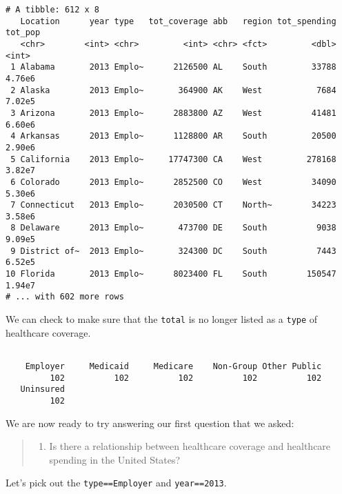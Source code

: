 \documentclass[]{article}
\newenvironment{Shaded}{\begin{snugshade}}{\end{snugshade}}
\newcommand{\KeywordTok}[1]{\textcolor[rgb]{0.13,0.29,0.53}{\textbf{#1}}}
\newcommand{\NormalTok}[1]{#1}
\newcommand{\OperatorTok}[1]{\textcolor[rgb]{0.81,0.36,0.00}{\textbf{#1}}}
\providecommand{\tightlist}{%
  \setlength{\itemsep}{0pt}\setlength{\parskip}{0pt}}
\begin{document}
\begin{verbatim}
# A tibble: 612 x 8
   Location      year type   tot_coverage abb   region tot_spending tot_pop
   <chr>        <int> <chr>         <int> <chr> <fct>         <dbl>   <int>
 1 Alabama       2013 Emplo~      2126500 AL    South         33788  4.76e6
 2 Alaska        2013 Emplo~       364900 AK    West           7684  7.02e5
 3 Arizona       2013 Emplo~      2883800 AZ    West          41481  6.60e6
 4 Arkansas      2013 Emplo~      1128800 AR    South         20500  2.90e6
 5 California    2013 Emplo~     17747300 CA    West         278168  3.82e7
 6 Colorado      2013 Emplo~      2852500 CO    West          34090  5.30e6
 7 Connecticut   2013 Emplo~      2030500 CT    North~        34223  3.58e6
 8 Delaware      2013 Emplo~       473700 DE    South          9038  9.09e5
 9 District of~  2013 Emplo~       324300 DC    South          7443  6.52e5
10 Florida       2013 Emplo~      8023400 FL    South        150547  1.94e7
# ... with 602 more rows
\end{verbatim}

We can check to make sure that the \texttt{total} is no longer listed as
a \texttt{type} of healthcare coverage.

\begin{Shaded}
\end{Shaded}

\begin{verbatim}

    Employer     Medicaid     Medicare    Non-Group Other Public 
         102          102          102          102          102 
   Uninsured 
         102 
\end{verbatim}

We are now ready to try answering our first question that we asked:

\begin{quote}
\begin{enumerate}
\def\labelenumi{\arabic{enumi}.}
\tightlist
\item
  Is there a relationship between healthcare coverage and healthcare
  spending in the United States?
\end{enumerate}
\end{quote}

Let's pick out the \texttt{type==Employer} and \texttt{year==2013}.
\end{document}
